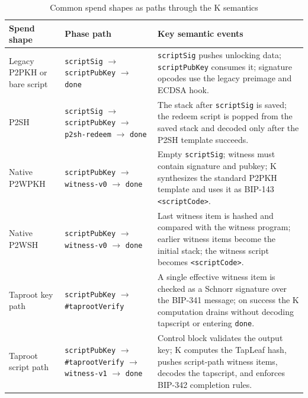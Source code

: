 \documentclass[conference]{IEEEtran}
\newcommand{\kcell}[1]{\texttt{<#1>}\xspace}
\begin{document}
\begin{table}[t]
  \caption{Common spend shapes as paths through the K semantics}
  \label{tab:spend-shapes}
  \centering
  \footnotesize
  \begin{tabular}{p{}p{}p{}}
    \toprule
    Spend shape & Phase path & Key semantic events \\
    \midrule
    Legacy P2PKH or bare script &
    \texttt{scriptSig} $\rightarrow$ \texttt{scriptPubKey} $\rightarrow$
    \texttt{done} &
    \texttt{scriptSig} pushes unlocking data; \texttt{scriptPubKey} consumes
    it; signature opcodes use the legacy preimage and ECDSA hook. \\
    P2SH &
    \texttt{scriptSig} $\rightarrow$ \texttt{scriptPubKey} $\rightarrow$
    \texttt{p2sh-redeem} $\rightarrow$ \texttt{done} &
    The stack after \texttt{scriptSig} is saved; the redeem script is popped
    from the saved stack and decoded only after the P2SH template succeeds. \\
    Native P2WPKH &
    \texttt{scriptPubKey} $\rightarrow$ \texttt{witness-v0} $\rightarrow$
    \texttt{done} &
    Empty \texttt{scriptSig}; witness must contain signature and pubkey;
    K synthesizes the standard P2PKH template and uses it as BIP-143
    \kcell{scriptCode}. \\
    Native P2WSH &
    \texttt{scriptPubKey} $\rightarrow$ \texttt{witness-v0} $\rightarrow$
    \texttt{done} &
    Last witness item is hashed and compared with the witness program; earlier
    witness items become the initial stack; the witness script becomes
    \kcell{scriptCode}. \\
    Taproot key path &
    \texttt{scriptPubKey} $\rightarrow$ \texttt{\#taprootVerify} &
    A single effective witness item is checked as a Schnorr signature over the
    BIP-341 message; on success the K computation drains without decoding
    tapscript or entering \texttt{done}. \\
    Taproot script path &
    \texttt{scriptPubKey} $\rightarrow$ \texttt{\#taprootVerify}
    $\rightarrow$ \texttt{witness-v1} $\rightarrow$ \texttt{done} &
    Control block validates the output key; K computes the TapLeaf hash,
    pushes script-path witness items, decodes the tapscript, and enforces
    BIP-342 completion rules. \\
    \bottomrule
  \end{tabular}
\end{table}
\end{document}
